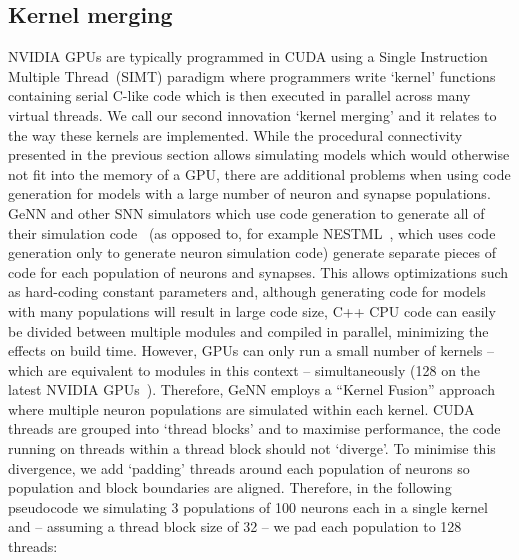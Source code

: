 \documentclass[9pt,a4paper]{amsart}
\begin{document}
\subsection{Kernel merging}
NVIDIA GPUs are typically programmed in CUDA using a Single Instruction Multiple Thread~(SIMT) paradigm where programmers write `kernel' functions containing serial C-like code which is then executed in parallel across many virtual threads.
We call our second innovation `kernel merging' and it relates to the way these kernels are implemented.
While the procedural connectivity presented in the previous section allows simulating models which would otherwise not fit into the memory of a GPU, there are additional problems when using code generation for models with a large number of neuron and synapse populations.
GeNN and other SNN simulators which use code generation to generate all of their simulation code~\citep{Blundell2018} (as opposed to, for example NESTML~\citep{Plotnikov2016}, which uses code generation only to generate neuron simulation code) generate separate pieces of code for each population of neurons and synapses.
This allows optimizations such as hard-coding constant parameters and, although generating code for models with many populations will result in large code size, C++ CPU code can easily be divided between multiple modules and compiled in parallel, minimizing the effects on build time.
However, GPUs can only run a small number of kernels -- which are equivalent to modules in this context --  simultaneously (128 on the latest NVIDIA GPUs~\citep[p278]{NVIDIACorporation2019}).
Therefore, GeNN employs a ``Kernel Fusion'' approach~\citep{Wang2010} where multiple neuron populations are simulated within each kernel.
CUDA threads are grouped into `thread blocks' and to maximise performance, the code running on  threads within a thread block should not `diverge'.
To minimise this divergence, we add `padding' threads around each population of neurons so population and block boundaries are aligned.
Therefore, in the following pseudocode we simulating 3 populations of 100 neurons each in a single kernel and -- assuming a thread block size of 32 -- we pad each population to 128 threads:
\end{document}
